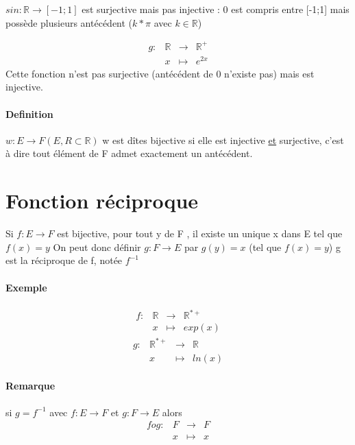 $sin : \mathbb{R} \rightarrow [-1;1]$ est surjective mais pas injective : 0 est compris entre [-1;1] mais possède plusieurs antécédent ($k*\pi$ avec $k\in\mathbb{R}$)


\[\begin{array}{rccl}
	g : & \mathbb{R} & \rightarrow & \mathbb{R}^+ \\
   & x & \mapsto & e^{2x}
\end{array}\]
Cette fonction n'est pas surjective (antécédent de 0 n'existe pas) mais est injective.

\paragraph{Definition} $w : E \rightarrow F (E,R \subset \mathbb{R})$
w est dîtes bijective si elle est injective \ul{et} surjective, c'est à dire tout élément de F admet exactement  un antécédent.

\section{Fonction réciproque}
Si $f:E\rightarrow F$ est bijective, pour tout y de F , il existe un unique x dans E tel que $f(x) = y$
On peut donc définir $g:F\rightarrow E$ par $g(y) = x$ (tel que $f(x)=y$)
g est la réciproque de f, notée $f^{-1}$

\paragraph{Exemple}
\[\begin{array}{rccl}
	f: & \mathbb{R} & \rightarrow & \mathbb{R}^{*+} \\
	   & x & \mapsto & exp(x)
\end{array}\]
 \[\begin{array}{rccl}
	g: & \mathbb{R}^{*+} & \rightarrow & \mathbb{R} \\
	   & x & \mapsto & ln(x)
 \end{array}\]

\paragraph{Remarque} si $g=f^{-1}$ avec $f: E \rightarrow F$ et $g: F \rightarrow E$ alors
\[\begin{array}{rccl}
	fog: & F & \rightarrow & F \\
	   & x & \mapsto & x
\end{array}\]

